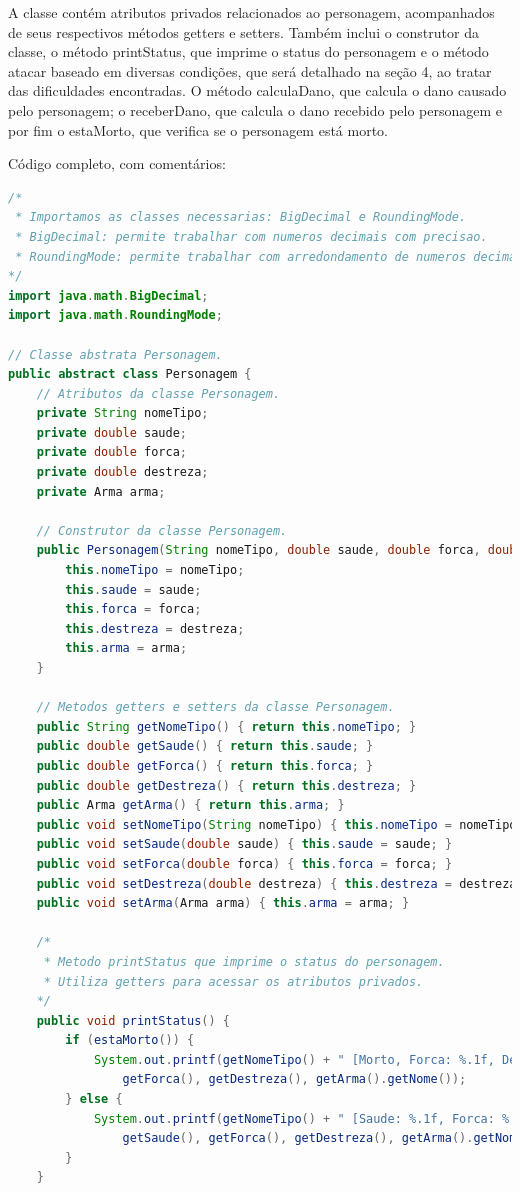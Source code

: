 \documentclass[11pt]{uiobrev}
\begin{document}
A classe contém atributos privados relacionados ao personagem, acompanhados de seus respectivos métodos getters e setters. Também inclui o construtor da classe, o método printStatus, que imprime o status do personagem e o método atacar baseado em diversas condições, que será detalhado na seção 4, ao tratar das dificuldades encontradas. O método calculaDano, que calcula o dano causado pelo personagem; o receberDano, que calcula o dano recebido pelo personagem e por fim o estaMorto, que verifica se o personagem está morto.

Código completo, com comentários: 

\begin{lstlisting}[language=Java, caption={Classe abstrata \texttt{Personagem}}]
/*
 * Importamos as classes necessarias: BigDecimal e RoundingMode.
 * BigDecimal: permite trabalhar com numeros decimais com precisao.
 * RoundingMode: permite trabalhar com arredondamento de numeros decimais.
*/
import java.math.BigDecimal;
import java.math.RoundingMode;

// Classe abstrata Personagem.
public abstract class Personagem {
    // Atributos da classe Personagem.
    private String nomeTipo;
    private double saude;
    private double forca;
    private double destreza;
    private Arma arma;

    // Construtor da classe Personagem.
    public Personagem(String nomeTipo, double saude, double forca, double destreza, Arma arma) {
        this.nomeTipo = nomeTipo;
        this.saude = saude;
        this.forca = forca;
        this.destreza = destreza;
        this.arma = arma;
    }

    // Metodos getters e setters da classe Personagem.
    public String getNomeTipo() { return this.nomeTipo; }
    public double getSaude() { return this.saude; }
    public double getForca() { return this.forca; }
    public double getDestreza() { return this.destreza; }
    public Arma getArma() { return this.arma; }
    public void setNomeTipo(String nomeTipo) { this.nomeTipo = nomeTipo; }
    public void setSaude(double saude) { this.saude = saude; }
    public void setForca(double forca) { this.forca = forca; }
    public void setDestreza(double destreza) { this.destreza = destreza; }
    public void setArma(Arma arma) { this.arma = arma; }

    /*
     * Metodo printStatus que imprime o status do personagem.
     * Utiliza getters para acessar os atributos privados.
    */
    public void printStatus() {
        if (estaMorto()) {
            System.out.printf(getNomeTipo() + " [Morto, Forca: %.1f, Destreza: %.1f, %s]\n",
                getForca(), getDestreza(), getArma().getNome());
        } else {
            System.out.printf(getNomeTipo() + " [Saude: %.1f, Forca: %.1f, Destreza: %.1f, %s]\n",
                getSaude(), getForca(), getDestreza(), getArma().getNome());
        }
    }


\end{lstlisting}
\end{document}
